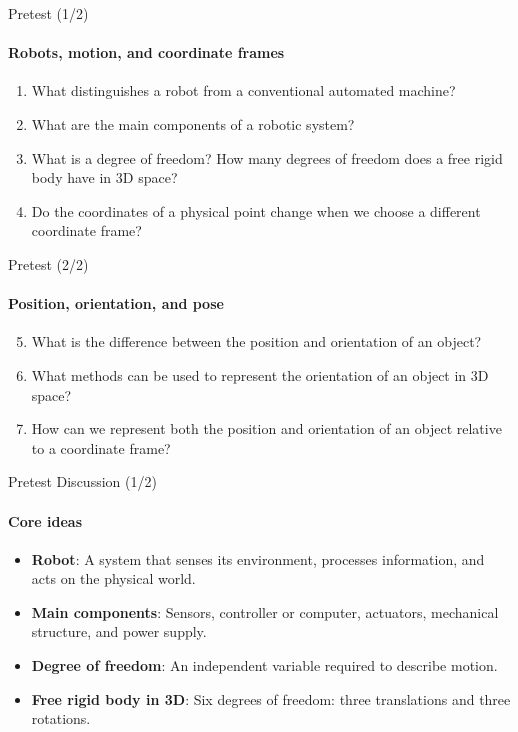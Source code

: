 \documentclass[aspectratio=169]{beamer}
\begin{document}
\begin{frame}[t]{Pretest (1/2)}
    \framesubtitle{Robots, motion, and coordinate frames}
    \large

    \begin{enumerate}
        \item What distinguishes a robot from a conventional automated machine?

        \item What are the main components of a robotic system?

        \item What is a degree of freedom? How many degrees of freedom does a
        free rigid body have in 3D space?

        \item Do the coordinates of a physical point change when we choose a
        different coordinate frame?
    \end{enumerate}
\end{frame}

\begin{frame}[t]{Pretest (2/2)}
    \framesubtitle{Position, orientation, and pose}
    \large

    \begin{enumerate}
        \setcounter{enumi}{4}

        \item What is the difference between the position and orientation
        of an object?

        \item What methods can be used to represent the orientation of an
        object in 3D space?

        \item How can we represent both the position and orientation of an
        object relative to a coordinate frame?
    \end{enumerate}
\end{frame}

\begin{frame}[t]{Pretest Discussion (1/2)}
    \framesubtitle{Core ideas}

    \begin{itemize}
        \item \textbf{Robot}: A system that senses its environment, processes
        information, and acts on the physical world.

        \item \textbf{Main components}: Sensors, controller or computer,
        actuators, mechanical structure, and power supply.

        \item \textbf{Degree of freedom}: An independent variable required to
        describe motion.

        \item \textbf{Free rigid body in 3D}: Six degrees of freedom:
        three translations and three rotations.
    \end{itemize}
\end{frame}
\end{document}
